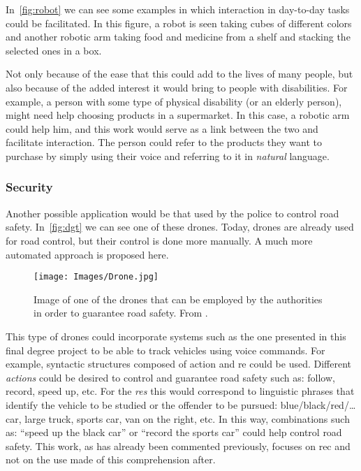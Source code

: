 In\ \vref{fig:robot} we can see some examples in which interaction in day-to-day
tasks could be facilitated. In this figure, a robot is seen taking cubes of
different colors and another robotic arm taking food and medicine from a shelf
and stacking the selected ones in a box.

Not only because of the ease that this could add to the lives of many people,
but also because of the added interest it would bring to people with
disabilities. For example, a person with some type of physical disability (or
an elderly person), might need help choosing products in a supermarket. In this
case, a robotic arm could help him, and this work would serve as a link between
the two and facilitate interaction. The person could refer to the products they
want to purchase by simply using their voice and referring to it in
\emph{natural} language.

\subsubsection{Security}

Another possible application would be that used by the police to control road
safety. In\ \vref{fig:dgt} we can see one of these drones. Today, drones are
already used for road control, but their control is done more manually. A much
more automated approach is proposed here.

\begin{figure}[ht]
  \centering
  \texttt{[image: Images/Drone.jpg]}
  \caption[Drones employed for road safety]{Image of one of the drones that can
    be employed by the authorities in order to guarantee road safety. From
    .}%
  \label{fig:dgt}
\end{figure}

This type of drones could incorporate systems such as the one presented in this
final degree project to be able to track vehicles using voice commands. For
example, syntactic structures composed of action and \gls{re} could be
used. Different \emph{actions} could be desired to control and guarantee road
safety such as: follow, record, speed up, etc. For the \emph{\glspl{re}} this
would correspond to linguistic phrases that identify the vehicle to be studied
or the offender to be pursued: blue/black/red/\ldots{} car, large truck, sports
car, van on the right, etc. In this way, combinations such as: ``speed up the
black car'' or ``record the sports car'' could help control road safety. This
work, as has already been commented previously, focuses on \gls{rec} and not on
the use made of this comprehension after.



